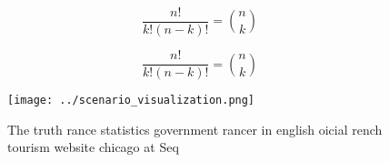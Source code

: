 \documentclass[a4paper]{article}
\begin{document}
\[ \frac{n!}{k!(n-k)!} = \binom{n}{k} \]

\[ \frac{n!}{k!(n-k)!} = \binom{n}{k} \]

\begin{figure}
\centering
\texttt{[image: ../scenario\_visualization.png]}
\caption{The truth rance statistics government rancer in english oicial rench tourism website chicago at Seq
}
\end{figure}
 
\end{document}

